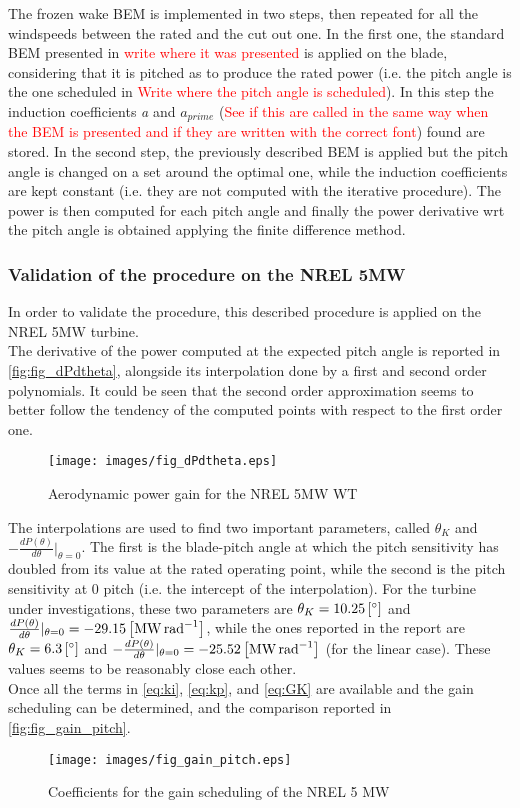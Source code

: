 The frozen wake BEM is implemented in two steps, then repeated for all the windspeeds between the rated and the cut out one. In the first one, the standard BEM presented in \textcolor{red}{write where it was presented} is applied on the blade, considering that it is pitched as to produce the rated power (i.e. the pitch angle is the one scheduled in \textcolor{red}{Write where the pitch angle is scheduled}). In this step the induction coefficients \textit{a} and \textit{$a_{prime}$} (\textcolor{red}{See if this are called in the same way when the BEM is presented and if they are written with the correct font}) found are stored. In the second step, the previously described BEM is applied but the pitch angle is changed on a set around the optimal one, while the induction coefficients are kept constant (i.e. they are not computed with the iterative procedure). The power is then computed for each pitch angle and finally the power derivative wrt the pitch angle is obtained applying the finite difference method.
\subsubsection{Validation of the procedure on the NREL 5MW}
In order to validate the procedure, this described procedure is applied on the NREL 5MW turbine.\\
The derivative of the power computed at the expected pitch angle is  reported in \autoref{fig:fig_dPdtheta}, alongside its interpolation done by a first and second order polynomials. It could be seen that the second order approximation seems to better follow the tendency of the computed points with respect to the first order one. 
\begin{figure}[htb]
    \centering
    \texttt{[image: images/fig\_dPdtheta.eps]}
    \caption{Aerodynamic power gain for the NREL 5MW WT}
    \label{fig:fig_dPdtheta}
\end{figure}

The interpolations are used to find two important parameters, called $\theta_{K}$ and  $-\frac{dP(\theta)}{d\theta}\vert_{\theta=0}$. The first is the blade-pitch angle at which the pitch sensitivity has doubled from its value at the rated operating point, while the second is the pitch sensitivity at 0 pitch (i.e. the intercept of the interpolation). For the turbine under investigations, these two parameters are $\theta_K=10.25 \left[\si{\degree}\right]$ and  $\frac{dP(\theta)}{d\theta}\vert_{\theta=0} = -29.15 \left[\si{\mega\watt\per\radian}\right]$, while the ones reported in the report are $\theta_K=6.3 \left[\si{\degree}\right]$ and  $-\frac{dP(\theta)}{d\theta}\vert_{\theta=0} = -25.52\left[\si{\mega\watt\per\radian}\right]$ (for the linear case). These values seems to be reasonably close each other.\\ 
Once all the terms in \autoref{eq:ki}, \ref{eq:kp}, and \ref{eq:GK} are available and the gain scheduling can be determined, and the comparison reported in \autoref{fig:fig_gain_pitch}.
\begin{figure}[htb]
    \centering
    \texttt{[image: images/fig\_gain\_pitch.eps]}
    \caption{Coefficients for the gain scheduling of the NREL 5 MW }
    \label{fig:fig_gain_pitch}
\end{figure}


